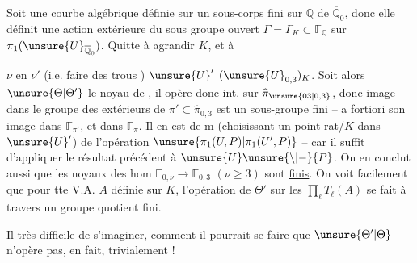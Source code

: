 Soit une courbe algébrique  définie sur un sous-corps  fini sur $\mathbb Q$ de $\overline{\mathbb Q}_0$, donc elle définit une action extérieure du sous groupe ouvert $\Gamma=\Gamma_K\subset\mathbb{\Gamma}_{\mathbb Q}$ sur $\pi_1(\unsure{U}_{\overline{\mathbb Q}_0})$.  Quitte à agrandir $K$,  et à 

$\nu$ en $\nu'$ (i.e. faire des trous )  $\unsure{U}'$   $(\unsure{U}_{0,3})_K$.
 
Soit alors $\unsure{\Theta|\Theta'}$ le noyau de
,
il opère donc   int. sur $\widehat{\pi}_{\unsure{03|0,3}}$, donc image  dans le groupe des  extérieurs de $\pi'\subset\widehat{\pi}_{0,3}$ est un sous-groupe fini -- a fortiori son image dans $\mathbb{\Gamma}_{\pi'}$, et dans  $\mathbb{\Gamma}_{\pi}$. Il en est de $\overline{\mathrm m}$ (choisissant un point  rat/$K$ dans $\unsure{U}'$) de l'opération   $\unsure{\pi_1(U,P)|\pi_1(U',P)}$ -- car il suffit d'appliquer le résultat précédent à $\unsure{U}\unsure{\backslash|-}\{P\}$. On en conclut aussi que  les noyaux des hom $\mathbb{\Gamma}_{0,\nu}\longrightarrow\mathbb{\Gamma}_{0,3}$ $(\nu\geq3)$ sont \uline{finis}. On voit facilement que pour tte V.A. $A$ définie sur $K$, l'opération de $\Theta'$ sur les $\prod_\ell T_\ell(A)$ se fait à travers un groupe quotient fini.

Il  très difficile de s'imaginer, comment il \unsure{\deleted{$\Theta$}} pourrait se faire que $\unsure{\Theta'|\Theta}$ n'opère pas, en fait, trivialement ! 


